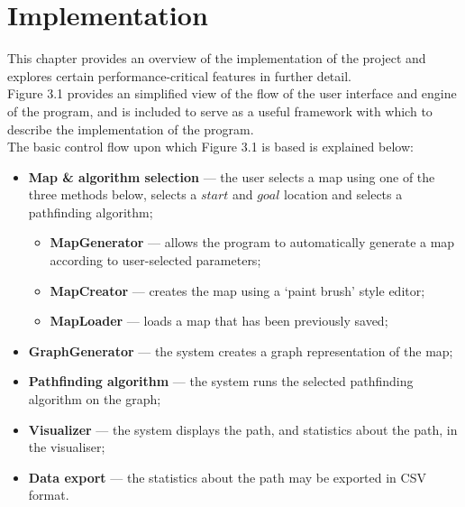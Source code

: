 \documentclass[12pt,notitlepage]{report}
\begin{document}
\chapter{Implementation}

This chapter provides an overview of the implementation of the project and explores certain performance-critical features in further detail.\\

\noindent
Figure 3.1 provides an simplified view of the flow of the user interface and engine of the program, and is included to serve as a useful framework with which to describe the implementation of the program.\\

\noindent
The basic control flow upon which Figure 3.1 is based is explained below:
\begin{itemize}
\item {\bfseries Map \& algorithm selection} --- the user selects a map using one of the three methods below, selects a $start$ and $goal$ location and selects a pathfinding algorithm;
  \begin{itemize}
  \item {\bfseries MapGenerator} --- allows the program to automatically generate a map according to user-selected parameters;
  \item {\bfseries MapCreator} --- creates the map using a `paint brush' style editor;
  \item {\bfseries MapLoader} --- loads a map that has been previously saved;
  \end{itemize}
\item {\bfseries GraphGenerator} --- the system creates a graph representation of the map;
\item {\bfseries Pathfinding algorithm} --- the system runs the selected pathfinding algorithm on the graph;
\item {\bfseries Visualizer} --- the system displays the path, and statistics about the path, in the visualiser;
\item {\bfseries Data export} --- the statistics about the path may be exported in CSV format.
\end{itemize}
\end{document}
